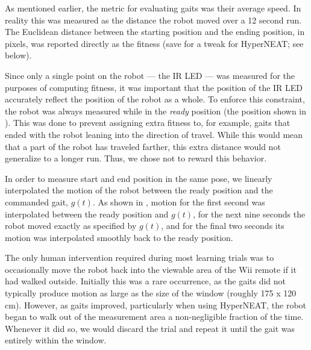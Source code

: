 As mentioned earlier, the metric for evaluating gaits was their
average speed.  In reality this was measured as the distance the robot
moved over a 12 second run.  The Euclidean distance between the
starting position and the ending position, in pixels, was reported
directly as the fitness (save for a tweak for HyperNEAT; see below).

Since only a single point on the robot --- the IR LED --- was measured
for the purposes of computing fitness, it was important that the
position of the IR LED accurately reflect the position of the robot as
a whole.  To enforce this constraint, the robot was always measured
while in the \emph{ready} position (the position shown in
).  This was done to prevent assigning extra
fitness to, for example, gaits that ended with the robot leaning into
the direction of travel.  While this would mean that a part of the
robot has traveled farther, this extra distance would not generalize
to a longer run.  Thus, we chose not to reward this behavior.

In order to measure start and end position in the same pose, we
linearly interpolated the motion of the robot between the ready
position and the commanded gait, $g(t)$.  As shown in
, motion for the first second was interpolated
between the ready position and $g(t)$, for the next nine seconds the
robot moved exactly as specified by $g(t)$, and for the final two
seconds its motion was interpolated smoothly back to the ready
position.




The only human intervention required during most learning trials was
to occasionally move the robot back into the viewable area of the Wii
remote if it had walked outside.  Initially this was a rare
occurrence, as the gaits did not typically produce motion as large as
the size of the window (roughly 175 x 120 cm).  However, as gaits
improved, particularly when using HyperNEAT, the robot began to walk
out of the measurement area a non-negligible fraction of the time.
Whenever it did so, we would discard the trial and repeat it until the
gait was entirely within the window.

